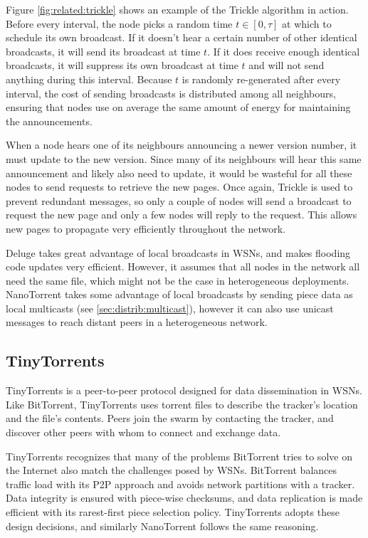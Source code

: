 Figure \ref{fig:related:trickle} shows an example of the Trickle algorithm in action. Before every interval, the node picks a random time $t \in [0, \tau]$ at which to schedule its own broadcast. If it doesn't hear a certain number of other identical broadcasts, it will send its broadcast at time $t$. If it does receive enough identical broadcasts, it will suppress its own broadcast at time $t$ and will not send anything during this interval. Because $t$ is randomly re-generated after every interval, the cost of sending broadcasts is distributed among all neighbours, ensuring that nodes use on average the same amount of energy for maintaining the announcements.

When a node hears one of its neighbours announcing a newer version number, it must update to the new version. Since many of its neighbours will hear this same announcement and likely also need to update, it would be wasteful for all these nodes to send requests to retrieve the new pages. Once again, Trickle is used to prevent redundant messages, so only a couple of nodes will send a broadcast to request the new page and only a few nodes will reply to the request. This allows new pages to propagate very efficiently throughout the network.

Deluge takes great advantage of local broadcasts in \glspl{WSN}, and makes flooding code updates very efficient. However, it assumes that all nodes in the network all need the same file, which might not be the case in heterogeneous deployments. NanoTorrent takes some advantage of local broadcasts by sending piece data as local multicasts (see \ref{sec:distrib:multicast}), however it can also use unicast messages to reach distant peers in a heterogeneous network.

\subsection{TinyTorrents}
\label{sec:related:tinytorrents}
TinyTorrents \cite{tinytorrents} is a peer-to-peer protocol designed for data dissemination in \glspl{WSN}. Like BitTorrent, TinyTorrents uses torrent files to describe the tracker's location and the file's contents. Peers join the swarm by contacting the tracker, and discover other peers with whom to connect and exchange data.

TinyTorrents recognizes that many of the problems BitTorrent tries to solve on the Internet also match the challenges posed by \glspl{WSN}. BitTorrent balances traffic load with its \gls{P2P} approach and avoids network partitions with a tracker. Data integrity is ensured with piece-wise checksums, and data replication is made efficient with its rarest-first piece selection policy. TinyTorrents adopts these design decisions, and similarly NanoTorrent follows the same reasoning.

